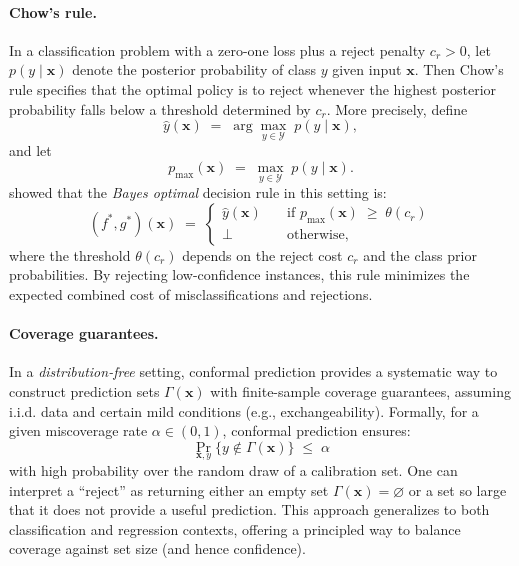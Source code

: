\paragraph{Chow's rule.}
In a classification problem with a zero-one loss plus a reject penalty $c_r > 0$, let $p(y \mid \bm{x})$ denote the posterior probability of class $y$ given input $\bm{x}$. Then Chow's rule \citep{chow1957optimum} specifies that the optimal policy is to reject whenever the highest posterior probability falls below a threshold determined by $c_r$. More precisely, define
\begin{equation}
\hat{y}(\bm{x}) \;=\; \arg\max_{y\in\mathcal{Y}} \;p(y \mid \bm{x}),
\end{equation}
and let 
\begin{equation}
p_{\max}(\bm{x}) \;=\; \max_{y\in\mathcal{Y}} \; p(y \mid \bm{x}).
\end{equation}
\citet{chow1957optimum} showed that the \emph{Bayes optimal} decision rule in this setting is:
\begin{equation}
(f^\ast, g^\ast)(\bm{x}) \;=\; \begin{cases}
\hat{y}(\bm{x}) \quad &\text{if } p_{\max}(\bm{x}) \;\geq\; \theta(c_r) \\
\bot \quad &\text{otherwise},
\end{cases}
\end{equation}
where the threshold $\theta(c_r)$ depends on the reject cost $c_r$ and the class prior probabilities. By rejecting low-confidence instances, this rule minimizes the expected combined cost of misclassifications and rejections.

\paragraph{Coverage guarantees.}
In a \emph{distribution-free} setting, conformal prediction provides a systematic way to construct prediction sets $\Gamma(\bm{x})$ with finite-sample coverage guarantees, assuming i.i.d. data and certain mild conditions (e.g., exchangeability). Formally, for a given miscoverage rate $\alpha \in (0,1)$, conformal prediction ensures:
\begin{equation}
\Pr_{\bm{x}, y}\bigl\{ y \notin \Gamma(\bm{x}) \bigr\} \;\le\; \alpha
\end{equation}
with high probability over the random draw of a calibration set. One can interpret a ``reject'' as returning either an empty set $\Gamma(\bm{x}) = \varnothing$ or a set so large that it does not provide a useful prediction. This approach generalizes to both classification and regression contexts, offering a principled way to balance coverage against set size (and hence confidence).


